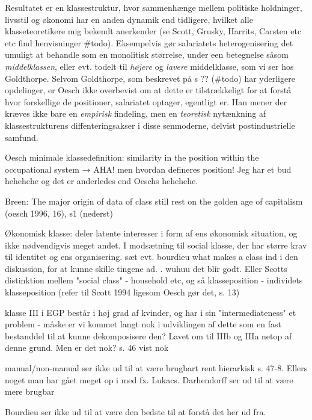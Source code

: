 Resultatet er en klassestruktur, hvor sammenhænge mellem politiske holdninger, livsstil og økonomi har en anden dynamik end tidligere, hvilket alle klasseteoretikere mig bekendt anerkender (se Scott, Grusky, Harrits, Carsten etc etc find henvisninger \#todo). Eksempelvis gør salariatets heterogenisering det umuligt at behandle som en monolitisk størrelse, under een betegnelse såsom \emph{middelklassen}, eller evt. todelt til \emph{højere} og \emph{lavere} middelklasse, som vi ser hos Goldthorpe. Selvom Goldthorpe, som beskrevet på s ?? (\#todo) har yderligere opdelinger, er Oesch ikke overbevist om at dette er tilstrækkeligt for at forstå hvor forskellige de positioner, salariatet optager, egentligt er. Han mener der kræves ikke bare en \emph{empirisk} findeling, men en \emph{teoretisk} nytænkning af klassestrukturens diffenteringsakser i disse senmoderne, delvist postindustrielle samfund. 

\iffalse
\label{iffalse}

Oesch minimale klassedefinition: similarity in the position within the occupational system \parencite[16]{Oesch2006a}
 	→ AHA! men hvordan defineres position! Jeg har et bud hehehehe og det er anderledes end Oeschs hehehehe.

Breen: The major origin of data of class still rest on the golden age of capitalism  (oesch 1996, 16), s1 (nederst)

Økonomisk klasse: deler latente interesser i form af ens økonomisk situation, og ikke nødvendigvis meget andet. I modsætning til social klasse, der har større krav til identitet og ens organisering.  sæt evt. bourdieu what makes a class ind i den diskussion, for at kunne skille tingene ad. . wuhuu det blir godt. Eller Scotts distinktion mellem "social class" - household etc, og så klasseposition - individets klasseposition (refer til Scott 1994 ligesom Oesch gør det, s. 13)





klasse III i EGP består i høj grad af kvinder, og har i sin "intermediateness" et problem - måske er vi kommet langt nok i udviklingen af dette som en fast bestanddel til at kunne dekomposisere den? Lavet om til IIIb og IIIa netop af denne grund. Men er det nok? s. 46 vist nok

manual/non-manual ser ikke ud til at være brugbart rent hierarkisk s. 47-8. Ellers noget man har gået meget op i med fx. Lukacs. Darhendorff ser ud til at være mere brugbar

Bourdieu ser ikke ud til at være den bedste til at forstå det her ud fra. 

